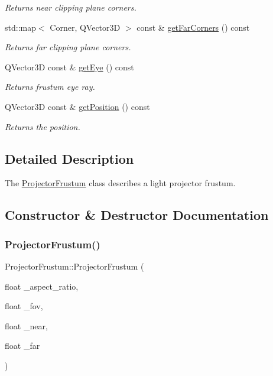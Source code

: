 \begin{DoxyCompactItemize}
\begin{DoxyCompactList}\small\item\em Returns near clipping plane corners. \end{DoxyCompactList}\item 
std\+::map$<$ Corner, Q\+Vector3D $>$ const  \& \mbox{\hyperlink{class_projector_frustum_a74ad1cd476b378e48135744f6083ef31}{get\+Far\+Corners}} () const
\begin{DoxyCompactList}\small\item\em Returns far clipping plane corners. \end{DoxyCompactList}\item 
Q\+Vector3D const  \& \mbox{\hyperlink{class_projector_frustum_ab0a343f5e94821717a6abcec7e4a6a5c}{get\+Eye}} () const
\begin{DoxyCompactList}\small\item\em Returns frustum eye ray. \end{DoxyCompactList}\item 
Q\+Vector3D const  \& \mbox{\hyperlink{class_projector_frustum_a45f134fc399cff7c2f3a518e8cf5674d}{get\+Position}} () const
\begin{DoxyCompactList}\small\item\em Returns the position. \end{DoxyCompactList}\end{DoxyCompactItemize}


\subsection{Detailed Description}
The \mbox{\hyperlink{class_projector_frustum}{Projector\+Frustum}} class describes a light projector frustum. 

\subsection{Constructor \& Destructor Documentation}
\mbox{\label{class_projector_frustum_aac915f2a3a87868d11f0bb66a18342db}} 
\subsubsection{\texorpdfstring{Projector\+Frustum()}{ProjectorFrustum()}}
{\footnotesize\ttfamily Projector\+Frustum\+::\+Projector\+Frustum (\begin{DoxyParamCaption}\item[{float}]{\+\_\+aspect\+\_\+ratio,  }\item[{float}]{\+\_\+fov,  }\item[{float}]{\+\_\+near,  }\item[{float}]{\+\_\+far }\end{DoxyParamCaption})}




